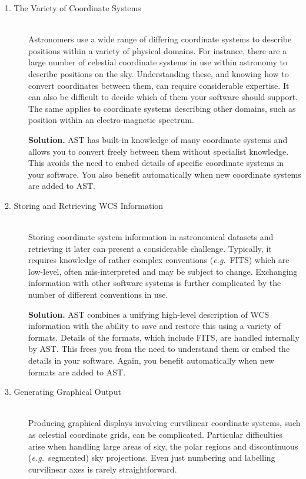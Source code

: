 \documentclass[twoside,11pt]{starlink}
\begin{document}
\begin{description}
\item[1. The Variety of Coordinate Systems]\mbox{}\\
Astronomers use a wide range of differing coordinate systems to describe
positions within a variety of physical domains. For instance, there are a
large number of celestial coordinate systems in use within astronomy to
describe positions on the sky. Understanding these, and knowing how to
convert coordinates between them, can require considerable expertise. It
can also be difficult to decide which of them your software should support.
The same applies to coordinate systems describing other domains, such as
position within an electro-magnetic spectrum.

\textbf{Solution.} AST has built-in knowledge of many coordinate systems
and allows you to convert freely between them without specialist
knowledge. This avoids the need to embed details of specific
coordinate systems in your software. You also benefit automatically
when new coordinate systems are added to AST.

\item[2. Storing and Retrieving WCS Information]\mbox{}\\
Storing coordinate system information in astronomical datasets and
retrieving it later can present a considerable challenge. Typically,
it requires knowledge of rather complex conventions
(\emph{e.g.}\ FITS) which are low-level, often mis-interpreted and may
be subject to change. Exchanging information with other software
systems is further complicated by the number of different conventions
in use.

\textbf{Solution.} AST combines a unifying high-level description of WCS
information with the ability to save and restore this using a variety
of formats. Details of the formats, which include FITS, are handled
internally by AST. This frees you from the need to understand them or
embed the details in your software. Again, you benefit automatically
when new formats are added to AST.

\item[3. Generating Graphical Output]\mbox{}\\
Producing graphical displays involving curvilinear coordinate systems,
such as celestial coordinate grids, can be complicated. Particular
difficulties arise when handling large areas of sky, the polar regions
and discontinuous (\emph{e.g.}\ segmented) sky projections.  Even just
numbering and labelling curvilinear axes is rarely straightforward.


\end{description}
\end{document}
